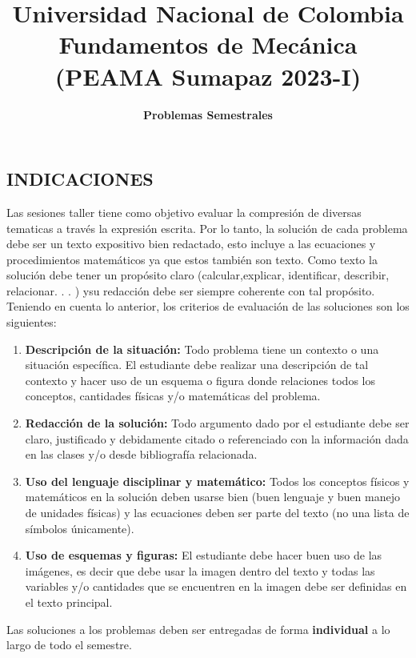 \documentclass{article}
\title{Universidad Nacional de Colombia\\ Fundamentos de Mecánica\\ (PEAMA Sumapaz 2023-I)} %
\author{\textbf{Problemas Semestrales}} %
\begin{document}
\maketitle

\subsection*{INDICACIONES}
Las sesiones taller tiene como objetivo evaluar la compresión de diversas tematicas a través la expresión escrita. Por lo tanto, la solución de cada problema debe ser un texto expositivo bien redactado, esto incluye a las ecuaciones y procedimientos matemáticos ya que estos también son texto. Como texto la solución debe tener un propósito claro (calcular,explicar, identificar, describir, relacionar. . . ) ysu redacción debe ser siempre coherente con tal propósito.\\

Teniendo en cuenta lo anterior, los criterios de evaluación de las soluciones son los siguientes:
\begin{enumerate}[label=\roman*)]
\item  \textbf{Descripción de la situación:} Todo problema tiene un contexto o una situación específica. El estudiante debe realizar una descripción de tal contexto y hacer uso de un esquema o figura donde relaciones todos los conceptos, cantidades físicas y/o matemáticas del problema.
\item \textbf{Redacción de la solución:} Todo argumento dado por el estudiante debe ser claro, justificado y debidamente citado o referenciado con la información dada en las clases y/o desde bibliografía relacionada.
\item \textbf{Uso del lenguaje disciplinar y matemático:} Todos los conceptos físicos y matemáticos en la solución deben usarse bien (buen lenguaje y buen manejo de unidades físicas) y las ecuaciones deben ser parte del texto (no una lista de símbolos únicamente).
\item \textbf{Uso de esquemas y figuras:} El estudiante debe hacer buen uso de las imágenes, es decir que debe usar la imagen dentro del texto y todas las variables y/o cantidades que se encuentren en la imagen debe ser definidas en el texto principal.
\end{enumerate}

Las soluciones a los problemas deben ser entregadas de forma \textbf{individual} a lo largo de todo el semestre. 
\end{document}
